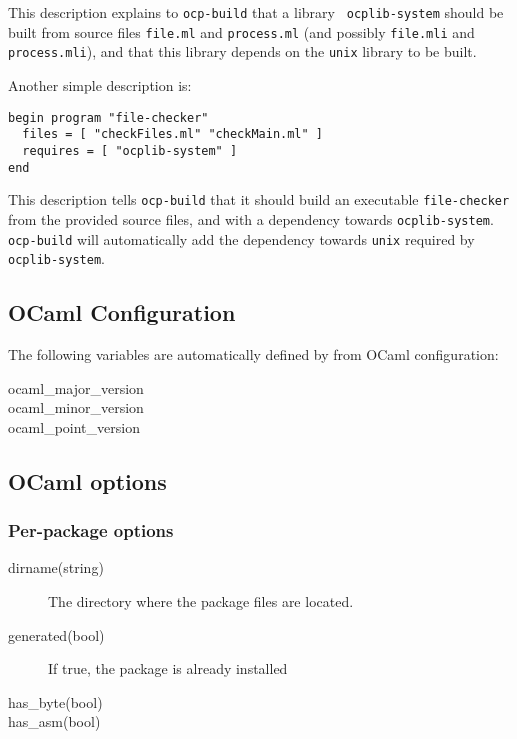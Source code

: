 This description explains to {\tt ocp-build} that a library {\tt
  ocplib-system} should be built from source files {\tt file.ml} and
{\tt process.ml} (and possibly {\tt file.mli} and {\tt process.mli}),
and that this library depends on the {\tt unix} library to be built.

Another simple description is:

\begin{verbatim}
begin program "file-checker"
  files = [ "checkFiles.ml" "checkMain.ml" ]
  requires = [ "ocplib-system" ]
end
\end{verbatim}

This description tells {\tt ocp-build} that it should build an
executable {\tt file-checker} from the provided source files, and with
a dependency towards {\tt ocplib-system}. {\tt ocp-build} will
automatically add the dependency towards {\tt unix} required by {\tt
  ocplib-system}.

\subsection{OCaml Configuration}

The following variables are automatically defined by
\ocpbuild{} from OCaml configuration:
\begin{description}
\item[ocaml\_major\_version]
\item[ocaml\_minor\_version]
\item[ocaml\_point\_version]
\end{description}

\subsection{OCaml options}

\subsubsection{Per-package options}

\begin{description}
\item[dirname(string)] The directory where the package files are located.
\item[generated(bool)] If true, the package is already installed
\item[has\_byte(bool)]
\item[has\_asm(bool)]
\end{description}


